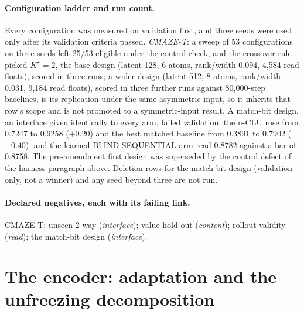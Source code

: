 \documentclass{article} %
\newcommand{\Kstar}{\ensuremath{K^{\star}}}
\begin{document}

\paragraph{Configuration ladder and run count.} Every configuration was measured on validation first,
and three seeds were used only after its validation criteria passed. \emph{CMAZE-T}: a sweep of
53 configurations on three seeds left 25/53 eligible under the control check, and the crossover rule picked
$\Kstar=2$, the base design (latent 128, 6 atoms, rank/width 0.094, 4,584 read floats), scored in three
runs; a wider design (latent 512, 8 atoms, rank/width 0.031, 9,184 read floats), scored in three further %
runs against 80,000-step baselines, is its replication under the same asymmetric input, so it inherits that row's scope and is not
promoted to a symmetric-input result. A match-bit design, an interface given identically to
every arm, failed validation: the n-CLU rose from 0.7247 to 0.9258 ($+0.20$) and the best matched
baseline from 0.3891 to 0.7902 ($+0.40$), and the learned BLIND-SEQUENTIAL arm read 0.8782 against a bar
of 0.8758. The pre-amendment first design was superseded by the control defect of the harness paragraph
above. Deletion rows for the match-bit design (validation only, not a winner) and any seed beyond three are
not run.
\paragraph{Declared negatives, each with its failing link.} CMAZE-T: unseen 2-way
(\emph{interface}); value hold-out (\emph{content}); rollout validity (\emph{read}); the match-bit
design (\emph{interface}).

\section{The encoder: adaptation and the unfreezing decomposition}
\label{app:encoder-main}
\end{document}
